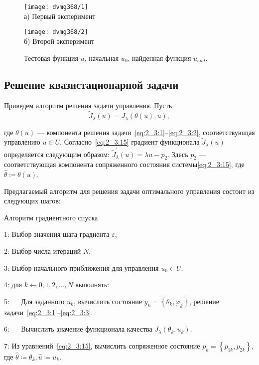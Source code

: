 \begin{figure}[ht]
    \begin{minipage}[b][][b]{0.49\linewidth}
        \centering
        \texttt{[image: dvmg368/1]} \\ а) Первый эксперимент
    \end{minipage}
    \hfill
    \begin{minipage}[b][][b]{0.49\linewidth}
        \centering
        \texttt{[image: dvmg368/2]} \\ б) Второй эксперимент
    \end{minipage}
    \caption{Тестовая функция $u$, начальная $u_0$, найденная функция $u_{end}.$}
    \label{fig:4_3:control}
\end{figure}

\subsection{Решение квазистационарной задачи}
\label{subsec:ch4/sec3/quasistationary}
Приведем алгоритм решения задачи управления.
Пусть
\[
    \widetilde{J}_{\lambda}(u)=J_{\lambda}(\theta(u), u),
\]

где $\theta(u)$ — компонента решения
задачи~\eqref{eq:2_3:1}--\eqref{eq:2_3:2},
соответствующая управлению $u \in U$.
Согласно~\eqref{eq:2_3:15} градиент функционала
$\widetilde{J}_{\lambda}(u)$ определяется
следующим образом: $\widetilde{J}_{\lambda}^{\prime}(u) = \lambda u-p_{2}$.
Здесь $p_{2}$ — соответствующая компонента сопряженного
состояния системы\eqref{eq:2_3:15}, где $\widehat{\theta}\coloneqq\theta(u)$.


Предлагаемый алгоритм для решения задачи оптимального управления
состоит из следующих шагов:

Алгоритм градиентного спуска

1: Выбор значения шага градиента $\varepsilon$,

2: Выбор числа итераций $N$,

3: Выбор начального приближения для управления $u_{0} \in U$,

4: для $k \leftarrow 0,1,2, \ldots, N$ выполнять:

5: $\quad$ Для заданного $u_{k}$, вычислить состояние
$y_{k}=\left\{\theta_{k}, \varphi_{k}\right\}$, решение
задачи~\eqref{eq:2_3:1}--\eqref{eq:2_3:3}.

6: $\quad$ Вычислить значение функционала качества
$J_{\lambda}\left(\theta_{k}, u_{k}\right)$.

7: Из уравнений~\eqref{eq:2_3:15}, вычислить сопряженное
состояние $p_{k}=\left\{p_{1 k}, p_{2 k}\right\}$,
где $\widehat{\theta} \coloneqq \theta_{k}, \widehat{u} \coloneqq u_{k}$.

